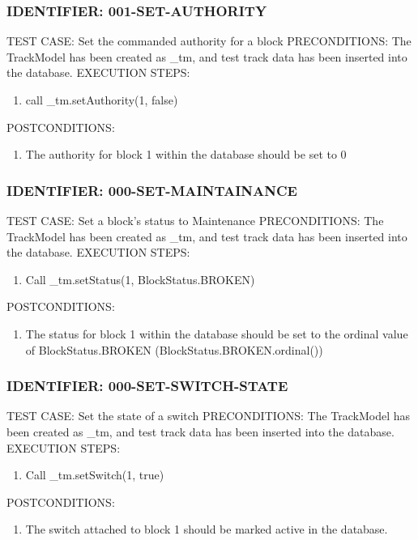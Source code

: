 \documentclass{scrreprt}
\begin{document}
\subsubsection{IDENTIFIER: 001-SET-AUTHORITY}
TEST CASE: Set the commanded authority for a block
PRECONDITIONS: The TrackModel has been created as _tm, and test track data has been inserted into the database.
EXECUTION STEPS:
\begin{enumerate}
	\item call _tm.setAuthority(1, false)
\end{enumerate}
POSTCONDITIONS:
\begin{enumerate}
	\item The authority for block 1 within the database should be set to 0
\end{enumerate}

\subsubsection{IDENTIFIER: 000-SET-MAINTAINANCE}
TEST CASE: Set a block's status to Maintenance
PRECONDITIONS: The TrackModel has been created as _tm, and test track data has been inserted into the database.
EXECUTION STEPS:
\begin{enumerate}
	\item Call _tm.setStatus(1, BlockStatus.BROKEN)
\end{enumerate}
POSTCONDITIONS:
\begin{enumerate}
	\item The status for block 1 within the database should be set to the ordinal value of BlockStatus.BROKEN (BlockStatus.BROKEN.ordinal())
\end{enumerate}

\subsubsection{IDENTIFIER: 000-SET-SWITCH-STATE}
TEST CASE: Set the state of a switch
PRECONDITIONS: The TrackModel has been created as _tm, and test track data has been inserted into the database.
EXECUTION STEPS:
\begin{enumerate}
	\item Call _tm.setSwitch(1, true)
\end{enumerate}
POSTCONDITIONS:
\begin{enumerate}
	\item The switch attached to block 1 should be marked active in the database.
\end{enumerate}
\end{document}
